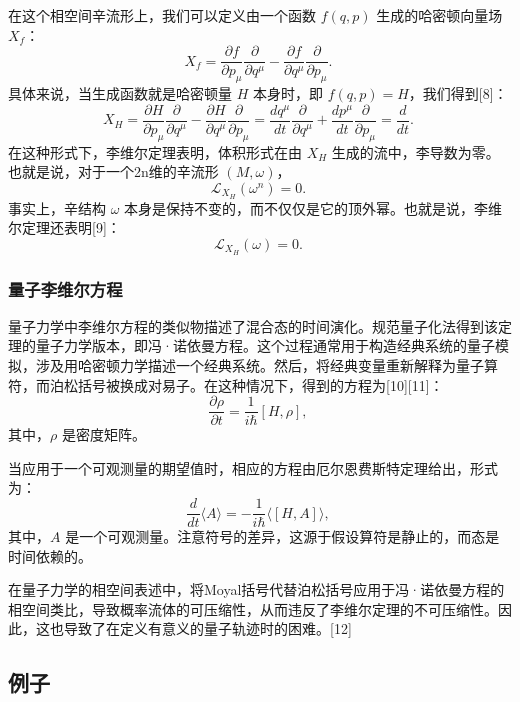 在这个相空间辛流形上，我们可以定义由一个函数 \( f(q, p) \) 生成的哈密顿向量场 \( X_f \)：
\[
X_f = \frac{\partial f}{\partial p_\mu} \frac{\partial}{\partial q^\mu} - \frac{\partial f}{\partial q^\mu} \frac{\partial}{\partial p_\mu}.~
\]
具体来说，当生成函数就是哈密顿量 \( H \) 本身时，即 \( f(q, p) = H \)，我们得到[8]：
\[
X_H = \frac{\partial H}{\partial p_\mu} \frac{\partial}{\partial q^\mu} - \frac{\partial H}{\partial q^\mu} \frac{\partial}{\partial p_\mu} = \frac{dq^\mu}{dt} \frac{\partial}{\partial q^\mu} + \frac{dp^\mu}{dt} \frac{\partial}{\partial p_\mu} = \frac{d}{dt}.~
\]
在这种形式下，李维尔定理表明，体积形式在由 \( X_H \) 生成的流中，李导数为零。也就是说，对于一个2n维的辛流形 \( (M, \omega) \)，
\[
\mathcal{L}_{X_H}(\omega^n) = 0.~
\]
事实上，辛结构 \( \omega \) 本身是保持不变的，而不仅仅是它的顶外幂。也就是说，李维尔定理还表明[9]：
\[
\mathcal{L}_{X_H}(\omega) = 0.~
\]
\subsubsection{量子李维尔方程}  
量子力学中李维尔方程的类似物描述了混合态的时间演化。规范量子化法得到该定理的量子力学版本，即冯·诺依曼方程。这个过程通常用于构造经典系统的量子模拟，涉及用哈密顿力学描述一个经典系统。然后，将经典变量重新解释为量子算符，而泊松括号被换成对易子。在这种情况下，得到的方程为[10][11]：
\[
\frac{\partial \rho}{\partial t} = \frac{1}{i\hbar}[H, \rho],~
\]
其中，\( \rho \) 是密度矩阵。

当应用于一个可观测量的期望值时，相应的方程由厄尔恩费斯特定理给出，形式为：
\[
\frac{d}{dt} \langle A \rangle = -\frac{1}{i\hbar} \langle [H, A] \rangle,~
\]
其中，\( A \) 是一个可观测量。注意符号的差异，这源于假设算符是静止的，而态是时间依赖的。

在量子力学的相空间表述中，将Moyal括号代替泊松括号应用于冯·诺依曼方程的相空间类比，导致概率流体的可压缩性，从而违反了李维尔定理的不可压缩性。因此，这也导致了在定义有意义的量子轨迹时的困难。[12]
\subsection{例子}  
